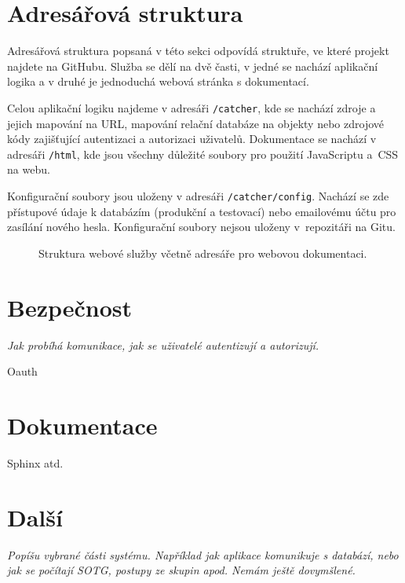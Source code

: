 
\section{Adresářová struktura}


\indent

Adresářová struktura popsaná v této sekci odpovídá struktuře, ve které projekt najdete na GitHubu.
Služba se dělí na dvě časti, v jedné se nachází aplikační logika a v druhé je jednoduchá webová stránka s dokumentací.

\medskip

Celou aplikační logiku najdeme v adresáři \texttt{/catcher}, kde se nachází zdroje a jejich mapování na URL,
mapování relační databáze na objekty nebo zdrojové kódy zajišťující autentizaci a autorizaci uživatelů.
Dokumentace se nachází v adresáři \texttt{/html}, kde jsou všechny důležité soubory pro použití JavaScriptu a~CSS na webu.

\medskip

Konfigurační soubory jsou uloženy v adresáři \texttt{/catcher/config}.
Nachází se zde přístupové údaje k databázím (produkční a testovací) nebo emailovému účtu pro zasílání nového hesla.
Konfigurační soubory nejsou uloženy v~repozitáři na Gitu. 

\begin{figure}[ht!]
\caption{Struktura webové služby včetně adresáře pro webovou dokumentaci.\label{overflow}}
\end{figure}

\section{Bezpečnost}

\textit{Jak probíhá komunikace, jak se uživatelé autentizují a autorizují.}

Oauth

\section{Dokumentace}

Sphinx atd.

\section{Další}

\textit{Popíšu vybrané části systému. Například jak aplikace komunikuje s databází, nebo jak se počítají SOTG, postupy ze skupin apod. Nemám ještě dovymšlené.}